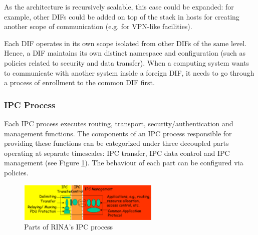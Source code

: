                 As the architecture is recursively scalable, this case could be expanded: for example, other DIFs could be added on top of the stack in hosts for creating another scope of communication (e.g. for VPN-like facilities).

                Each DIF operates in its own scope isolated from other DIFs of the same level. Hence, a DIF maintains its own distinct namespace and configuration (such as policies related to security and data transfer). When a computing system wants to communicate with another system inside a foreign DIF, it needs to go through a process of enrollment to the common DIF first.

            \subsubsection{IPC Process}

                Each IPC process executes routing, transport, security/authentication and management functions. The components of an IPC process responsible for providing these functions can be categorized under three decoupled parts operating at separate timescales: IPC transfer, IPC data control and IPC management (see Figure \ref{fig:rina_ipcp}). The behaviour of each part can be configured via policies.

                \begin{figure}[H]
                    \begin{center}
                        \includegraphics[width=0.6\textwidth]{fig/archs_rina-ipcp.png}
                      \caption{Parts of RINA's IPC process}
                      \label{fig:rina_ipcp}
                    \end{center}
                \end{figure}

